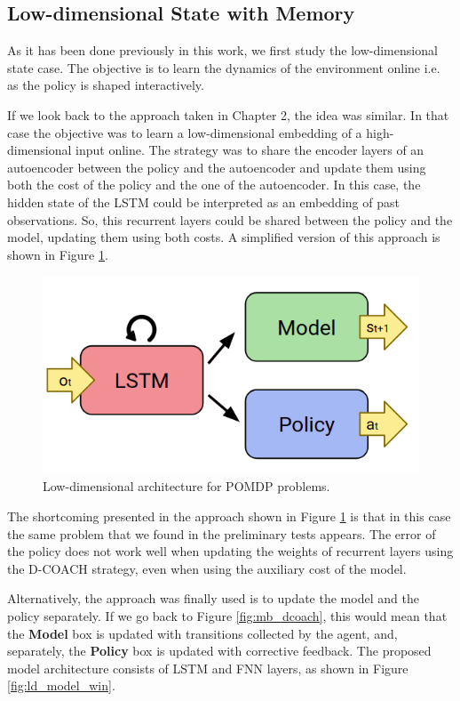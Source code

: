\subsection{Low-dimensional State with Memory}
As it has been done previously in this work, we first study the low-dimensional state case. The objective is to learn the dynamics of the environment online i.e. as the policy is shaped interactively. 

If we look back to the approach taken in Chapter 2, the idea was similar. In that case the objective was to learn a low-dimensional embedding of a high-dimensional input online. The strategy was to share the encoder layers of an autoencoder between the policy and the autoencoder and update them using both the cost of the policy and the one of the autoencoder. In this case, the hidden state of the LSTM could be interpreted as an embedding of past observations. So, this recurrent layers could be shared between the policy and the model, updating them using both costs. A simplified version of this approach is shown in Figure \ref{fig:ld_model_rip}.

\begin{figure}[h]
    \centering
    \includegraphics[width=0.6\linewidth]{imagenes/cap4/ld_model_rip.png}
    \caption{Low-dimensional architecture for POMDP problems.}
    \label{fig:ld_model_rip}
\end{figure}

The shortcoming presented in the approach shown in Figure \ref{fig:ld_model_rip} is that in this case the same problem that we found in the preliminary tests appears. The error of the policy does not work well when updating the weights of recurrent layers using the D-COACH strategy, even when using the auxiliary cost of the model. 

Alternatively, the approach was finally used is to update the model and the policy separately. If we go back to Figure \ref{fig:mb_dcoach}, this would mean that the \textbf{Model} box is updated with transitions collected by the agent, and, separately, the \textbf{Policy} box is updated with corrective feedback. The proposed model architecture consists of LSTM and FNN layers, as shown in Figure \ref{fig:ld_model_win}.

